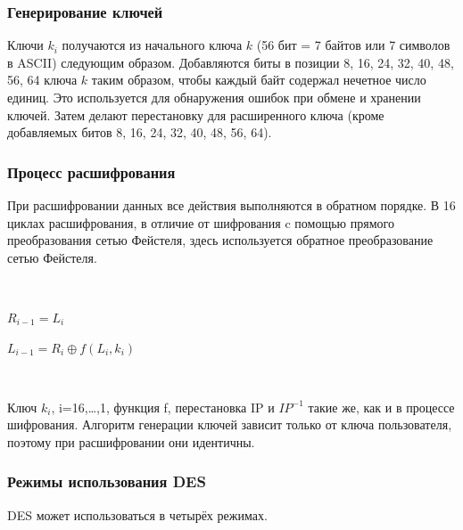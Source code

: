 \documentclass[a4paper]{report}
\begin{document}
\subsubsection{Генерирование ключей}
Ключи $k_{i}$ получаются из начального ключа $k$ (56 бит = 7 байтов или 7 символов в ASCII) следующим образом. Добавляются биты в позиции 8, 16, 24, 32, 40, 48, 56, 64 ключа $k$ таким образом, чтобы каждый байт содержал нечетное число единиц. Это используется для обнаружения ошибок при обмене и хранении ключей. Затем делают перестановку для расширенного ключа (кроме добавляемых битов 8, 16, 24, 32, 40, 48, 56, 64).

\subsubsection{Процесс расшифрования}
При расшифровании данных все действия выполняются в обратном порядке. В 16 циклах расшифрования, в отличие от шифрования c помощью прямого преобразования сетью Фейстеля, здесь используется обратное преобразование сетью Фейстеля.

~

$R_{i-1} = L_i$ 

$L_{i-1} = R_i \oplus f(L_i,k_i)$

~

Ключ $k_{i}$, i=16,…,1, функция f, перестановка IP и $IP^{-1}$ такие же, как и в процессе шифрования. Алгоритм генерации ключей зависит только от ключа пользователя, поэтому при расшифровании они идентичны.


\subsubsection{Режимы использования DES}
DES может использоваться в четырёх режимах.
\end{document}
